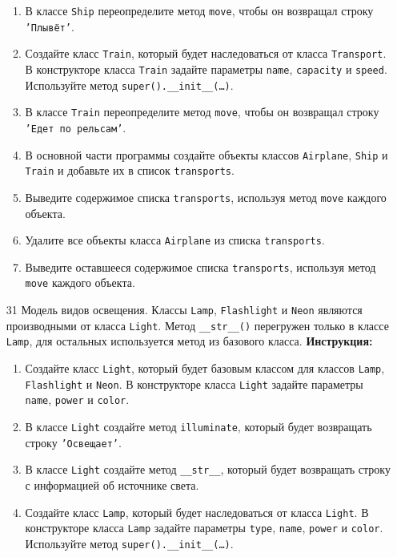 \begin{enumerate}
\begin{enumerate}
    \item В классе \texttt{Ship} переопределите метод \texttt{move}, чтобы он возвращал строку \texttt{'Плывёт'}.
    \item Создайте класс \texttt{Train}, который будет наследоваться от класса \texttt{Transport}. В конструкторе класса \texttt{Train} задайте параметры \texttt{name}, \texttt{capacity} и \texttt{speed}. Используйте метод \texttt{super().\_\_init\_\_(\ldots)}.
    \item В классе \texttt{Train} переопределите метод \texttt{move}, чтобы он возвращал строку \texttt{'Едет по рельсам'}.
    \item В основной части программы создайте объекты классов \texttt{Airplane}, \texttt{Ship} и \texttt{Train} и добавьте их в список \texttt{transports}.
    \item Выведите содержимое списка \texttt{transports}, используя метод \texttt{move} каждого объекта.
    \item Удалите все объекты класса \texttt{Airplane} из списка \texttt{transports}.
    \item Выведите оставшееся содержимое списка \texttt{transports}, используя метод \texttt{move} каждого объекта.
\end{enumerate}
\item[31]
Модель видов освещения. Классы \texttt{Lamp}, \texttt{Flashlight} и \texttt{Neon} являются производными от класса \texttt{Light}. Метод \texttt{\_\_str\_\_()} перегружен только в классе \texttt{Lamp}, для остальных используется метод из базового класса.
\textbf{Инструкция:}
\begin{enumerate}
    \item Создайте класс \texttt{Light}, который будет базовым классом для классов \texttt{Lamp}, \texttt{Flashlight} и \texttt{Neon}. В конструкторе класса \texttt{Light} задайте параметры \texttt{name}, \texttt{power} и \texttt{color}.
    \item В классе \texttt{Light} создайте метод \texttt{illuminate}, который будет возвращать строку \texttt{'Освещает'}.
    \item В классе \texttt{Light} создайте метод \texttt{\_\_str\_\_}, который будет возвращать строку с информацией об источнике света.
    \item Создайте класс \texttt{Lamp}, который будет наследоваться от класса \texttt{Light}. В конструкторе класса \texttt{Lamp} задайте параметры \texttt{type}, \texttt{name}, \texttt{power} и \texttt{color}. Используйте метод \texttt{super().\_\_init\_\_(\ldots)}.

\end{enumerate}
\end{enumerate}
